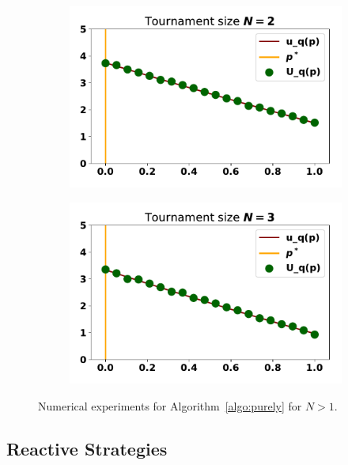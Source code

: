 \documentclass[10pt]{article}
\begin{document}
\begin{figure}
    \centering
    \begin{subfigure}{0.45\textwidth}
        \centering
        \includegraphics[width=.95\textwidth]{img/purely_random_tournament_one.pdf}
    \end{subfigure}
    \begin{subfigure}{0.45\textwidth}
        \centering
        \includegraphics[width=.95\textwidth]{img/purely_random_tournament_two.pdf}
    \end{subfigure}
    \caption{Numerical experiments for Algorithm~\ref{algo:purely} for \(N>1\).}
    \label{fig:purely_random_tournament_results}
\end{figure}

\subsection{Reactive Strategies}
\end{document}
